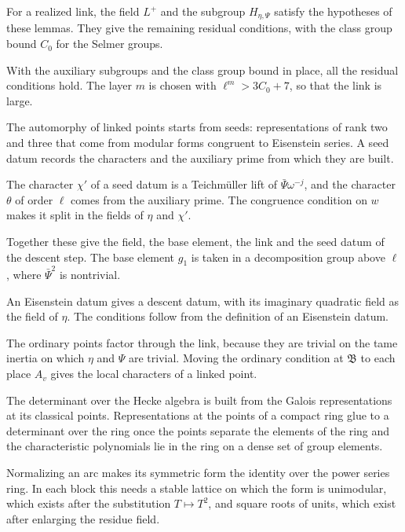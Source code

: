 For a realized link, the field $L^+$ and the subgroup $H_{\eta,\Psi}$ satisfy the hypotheses of these lemmas. They give the remaining residual conditions, with the class group bound $C_0$ for the Selmer groups.

With the auxiliary subgroups and the class group bound in place, all the residual conditions hold. The layer $m$ is chosen with $\ell^m>3C_0+7$, so that the link is large.

The automorphy of linked points starts from seeds: representations of rank two and three that come from modular forms congruent to Eisenstein series. A seed datum records the characters and the auxiliary prime from which they are built.

The character $\chi'$ of a seed datum is a Teichm\"uller lift of $\bar\Psi\omega^{-j}$, and the character $\theta$ of order $\ell$ comes from the auxiliary prime. The congruence condition on $w$ makes it split in the fields of $\eta$ and $\chi'$.

Together these give the field, the base element, the link and the seed datum of the descent step. The base element $g_1$ is taken in a decomposition group above $\ell$, where $\bar\Psi^2$ is nontrivial.

An Eisenstein datum gives a descent datum, with its imaginary quadratic field as the field of $\eta$. The conditions follow from the definition of an Eisenstein datum.

The ordinary points factor through the link, because they are trivial on the tame inertia on which $\eta$ and $\Psi$ are trivial. Moving the ordinary condition at $\mathfrak B$ to each place $A_v$ gives the local characters of a linked point.

The determinant over the Hecke algebra is built from the Galois representations at its classical points. Representations at the points of a compact ring glue to a determinant over the ring once the points separate the elements of the ring and the characteristic polynomials lie in the ring on a dense set of group elements.

Normalizing an arc makes its symmetric form the identity over the power series ring. In each block this needs a stable lattice on which the form is unimodular, which exists after the substitution $T\mapsto T^2$, and square roots of units, which exist after enlarging the residue field.

